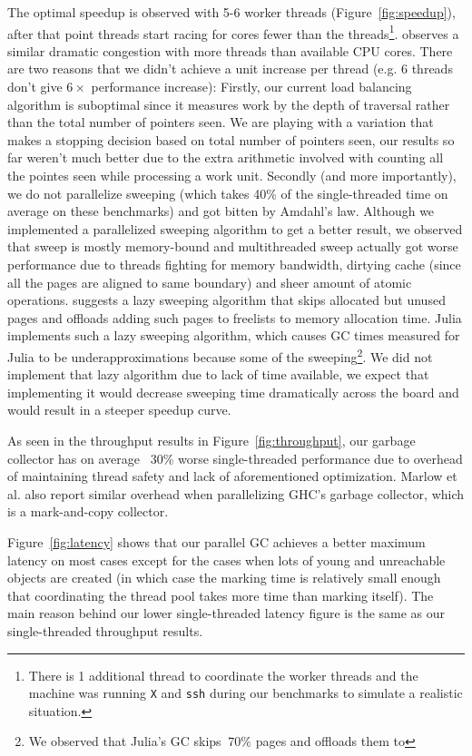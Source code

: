The optimal speedup is observed with 5-6 worker threads (Figure~\ref{fig:speedup}), after that point threads start racing for cores fewer than the threads\footnote{There is 1 additional thread to coordinate the worker threads and the machine was running \texttt{X} and \texttt{ssh} during our benchmarks to simulate a realistic situation.}.
\cite{marlow2011multicore} observes a similar dramatic congestion with more threads than available CPU cores.
There are two reasons that we didn't achieve a unit increase per thread (e.g. 6 threads don't give $6\times$ performance increase):
Firstly, our current load balancing algorithm is suboptimal since it measures work by the depth of traversal rather than the total number of pointers seen.
We are playing with a variation that makes a stopping decision based on total number of pointers seen, our results so far weren't much better due to the extra arithmetic involved with counting all the pointes seen while processing a work unit.
Secondly (and more importantly), we do not parallelize sweeping (which takes 40\% of the single-threaded time on average on these benchmarks) and got bitten by Amdahl's law.
Although we implemented a parallelized sweeping algorithm to get a better result, we observed that sweep is mostly memory-bound and multithreaded sweep actually got worse performance due to threads fighting for memory bandwidth, dirtying cache (since all the pages are aligned to same boundary) and sheer amount of atomic operations.
\cite{boehm1991mostly} suggests a lazy sweeping algorithm that skips allocated but unused pages and offloads adding such pages to freelists to memory allocation time.
Julia implements such a lazy sweeping algorithm, which causes GC times measured for Julia to be underapproximations because some of the sweeping\footnote{We observed that Julia's GC skips $~70\%$ pages and offloads them to }.
We did not implement that lazy algorithm due to lack of time available, we expect that implementing it would decrease sweeping time dramatically across the board and would result in a steeper speedup curve.

As seen in the throughput results in Figure~\ref{fig:throughput}, our garbage collector has on average ~30\% worse single-threaded performance due to overhead of maintaining thread safety and lack of aforementioned optimization.
Marlow et al. \cite{marlow2008parallel} also report similar overhead when parallelizing GHC's garbage collector, which is a mark-and-copy collector.

Figure~\ref{fig:latency} shows that our parallel GC achieves a better maximum latency on most cases except for the cases when lots of young and unreachable objects are created (in which case the marking time is relatively small enough that coordinating the thread pool takes more time than marking itself).
The main reason behind our lower single-threaded latency figure is the same as our single-threaded throughput results.

